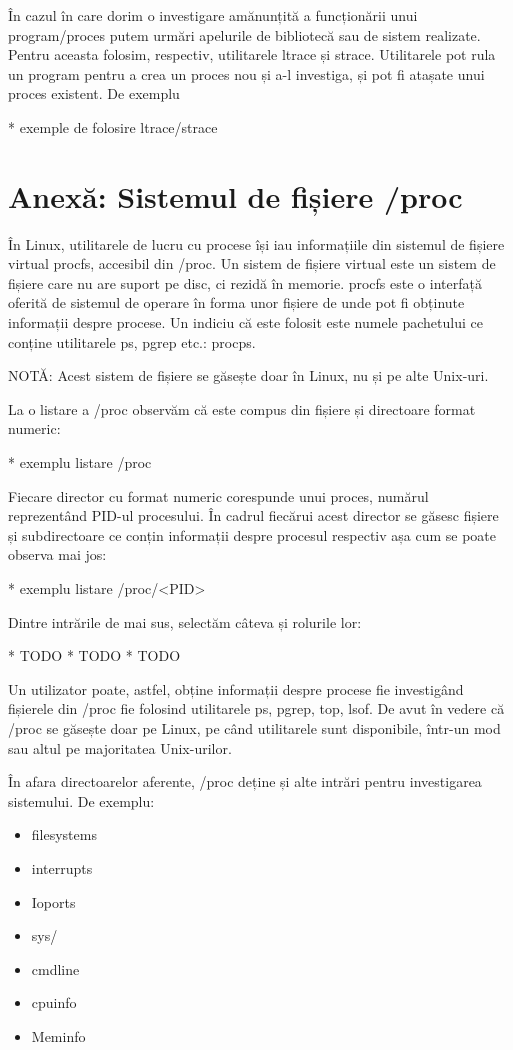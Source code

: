 În cazul în care dorim o investigare amănunțită a funcționării unui
program/proces putem urmări apelurile de bibliotecă sau de sistem realizate.
Pentru aceasta folosim, respectiv, utilitarele ltrace și strace. Utilitarele pot
rula un program pentru a crea un proces nou și a-l investiga, și pot fi atașate
unui proces existent. De exemplu

* exemple de folosire ltrace/strace

\section{Anexă: Sistemul de fișiere /proc}
\label{sec:procese-proc}

În Linux, utilitarele de lucru cu procese își iau informațiile din sistemul de
fișiere virtual procfs, accesibil din /proc. Un sistem de fișiere virtual este
un sistem de fișiere care nu are suport pe disc, ci rezidă în memorie. procfs
este o interfață oferită de sistemul de operare în forma unor fișiere de unde
pot fi obținute informații despre procese. Un indiciu că este folosit este
numele pachetului ce conține utilitarele ps, pgrep etc.: procps.

NOTĂ: Acest sistem de fișiere se găsește doar în Linux, nu și pe alte Unix-uri.

La o listare a /proc observăm că este compus din fișiere și directoare format numeric:

* exemplu listare /proc

Fiecare director cu format numeric corespunde unui proces, numărul reprezentând
PID-ul procesului. În cadrul fiecărui acest director se găsesc fișiere și
subdirectoare ce conțin informații despre procesul respectiv așa cum se poate
observa mai jos:

* exemplu listare /proc/<PID>

Dintre intrările de mai sus, selectăm câteva și rolurile lor:

* TODO
* TODO
* TODO

Un utilizator poate, astfel, obține informații despre procese fie investigând
fișierele din /proc fie folosind utilitarele ps, pgrep, top, lsof. De avut în
vedere că /proc se găsește doar pe Linux, pe când utilitarele sunt disponibile,
într-un mod sau altul pe majoritatea Unix-urilor.

În afara directoarelor aferente, /proc deține și alte intrări pentru investigarea sistemului. De exemplu:

\begin{itemize}
	\item filesystems
	\item interrupts
	\item Ioports
	\item sys/
	\item cmdline
	\item cpuinfo
	\item Meminfo
\end{itemize}

